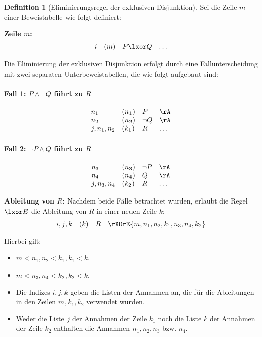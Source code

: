 \documentclass{book}
\theoremstyle{plain}
\theoremstyle{remark}
\theoremstyle{definition}
\newtheorem{definition}{Definition}[section]
\begin{document}
\begin{definition}[Eliminierungsregel der exklusiven Disjunktion]
Sei die Zeile \(m\) einer Beweistabelle wie folgt definiert:

\textbf{Zeile \(m\):}
\[
\begin{array}{l l l l}
    i & (m) & P \lxor Q & \dots \\
\end{array}
\]

Die Eliminierung der exklusiven Disjunktion erfolgt durch eine Fallunterscheidung mit zwei separaten Unterbeweistabellen, die wie folgt aufgebaut sind:

\paragraph{Fall 1: \(P \land \neg Q\) führt zu \(R\)}
\[
\begin{array}{l l l l}
    n_1 & (n_1) & P & \rA \\
    n_2 & (n_2) & \neg Q & \rA \\
    j,n_1,n_2 & (k_1) & R & \dots \\
\end{array}
\]

\paragraph{Fall 2: \(\neg P \land Q\) führt zu \(R\)}
\[
\begin{array}{l l l l}
    n_3 & (n_3) & \neg P & \rA \\
    n_4 & (n_4) & Q & \rA \\
    j,n_3,n_4 & (k_2) & R & \dots \\
\end{array}
\]

\textbf{Ableitung von \(R\):}
Nachdem beide Fälle betrachtet wurden, erlaubt die Regel \(\lxor E\) die Ableitung von \(R\) in einer neuen Zeile \(k\):
\[
\begin{array}{l l l l}
    i,j,k & (k) & R & \rXOrE{m,n_1,n_2,k_1,n_3,n_4,k_2} \\
\end{array}
\]

Hierbei gilt:
\begin{itemize}
    \item \(m < n_1, n_2 < k_1, k_1 < k\).
    \item \(m < n_3, n_4 < k_2, k_2 < k\).
    \item Die Indizes \(i, j, k\) geben die Listen der Annahmen an, die für die Ableitungen in den Zeilen \(m, k_1, k_2\) verwendet wurden.
    \item Weder die Liste \(j\) der Annahmen der Zeile \(k_1\) noch die Liste \(k\) der Annahmen der Zeile \(k_2\) enthalten die Annahmen \(n_1, n_2, n_3\) bzw. \(n_4\).
\end{itemize}

\end{definition}
\end{document}
